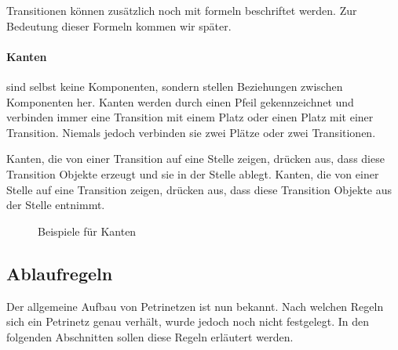 	Transitionen können zusätzlich noch mit formeln beschriftet werden. Zur Bedeutung dieser Formeln kommen wir später.

	\paragraph{Kanten} sind selbst keine Komponenten, sondern stellen Beziehungen zwischen Komponenten her. Kanten werden durch einen Pfeil gekennzeichnet und verbinden immer eine Transition mit einem Platz oder einen Platz mit einer Transition. Niemals jedoch verbinden sie zwei Plätze oder zwei Transitionen.

	Kanten, die von einer Transition auf eine Stelle zeigen, drücken aus, dass diese Transition Objekte erzeugt und sie in der Stelle ablegt. Kanten, die von einer Stelle auf eine Transition zeigen, drücken aus, dass diese Transition Objekte aus der Stelle entnimmt.

	\begin{figure}[h]
		\centering
		\caption{Beispiele für Kanten}
		\label{fig:kanten}
	\end{figure}

\subsection{Ablaufregeln}
\label{ssub:ablaufregeln}
	Der allgemeine Aufbau von Petrinetzen ist nun bekannt. Nach welchen Regeln sich ein Petrinetz genau verhält, wurde jedoch noch nicht festgelegt. In den folgenden Abschnitten sollen diese Regeln erläutert werden.

